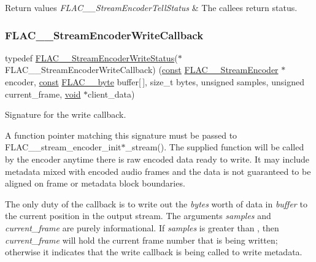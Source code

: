 \begin{DoxyRetVals}{Return values}
{\em F\+L\+A\+C\+\_\+\+\_\+\+Stream\+Encoder\+Tell\+Status} & The callee\textquotesingle{}s return status. \\
\hline
\end{DoxyRetVals}
\mbox{\label{group__flac__stream__encoder_ga50865125fd57c40fab6eb2f062651429}} 
\subsubsection{\texorpdfstring{F\+L\+A\+C\+\_\+\+\_\+\+Stream\+Encoder\+Write\+Callback}{FLAC\_\_StreamEncoderWriteCallback}}
{\footnotesize\ttfamily typedef \hyperlink{group__flac__stream__encoder_ga3737471fd49730bb8cf9b182bdeda05e}{F\+L\+A\+C\+\_\+\+\_\+\+Stream\+Encoder\+Write\+Status}($\ast$ F\+L\+A\+C\+\_\+\+\_\+\+Stream\+Encoder\+Write\+Callback) (\hyperlink{zconf_8h_a2c212835823e3c54a8ab6d95c652660e}{const} \hyperlink{struct_f_l_a_c_____stream_encoder}{F\+L\+A\+C\+\_\+\+\_\+\+Stream\+Encoder} $\ast$encoder, \hyperlink{zconf_8h_a2c212835823e3c54a8ab6d95c652660e}{const} \hyperlink{ordinals_8h_a5eb569b12d5b047cdacada4d57924ee3}{F\+L\+A\+C\+\_\+\+\_\+byte} buffer\mbox{[}$\,$\mbox{]}, size\+\_\+t bytes, unsigned samples, unsigned current\+\_\+frame, \hyperlink{png_8h_ac9c84fa68bbad002983e35ce3663c686}{void} $\ast$client\+\_\+data)}

Signature for the write callback.

A function pointer matching this signature must be passed to F\+L\+A\+C\+\_\+\+\_\+stream\+\_\+encoder\+\_\+init$\ast$\+\_\+stream(). The supplied function will be called by the encoder anytime there is raw encoded data ready to write. It may include metadata mixed with encoded audio frames and the data is not guaranteed to be aligned on frame or metadata block boundaries.

The only duty of the callback is to write out the {\itshape bytes} worth of data in {\itshape buffer} to the current position in the output stream. The arguments {\itshape samples} and {\itshape current\+\_\+frame} are purely informational. If {\itshape samples} is greater than {}, then {\itshape current\+\_\+frame} will hold the current frame number that is being written; otherwise it indicates that the write callback is being called to write metadata.

